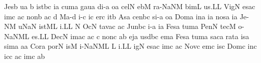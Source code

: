 \spatium
\sgn Jes\punctum b\egn
\sgn {}u{}\punctum a\egn
\spatium
\custos b
\lineaproxima
{}i{st}\pes bc\egn
\sgn {}i{}\punctum a\egn
\spatium
\sgn cum\punctum a\egn
\spatium
\sgn gau\punctum a\egn
\sgn di-\punctum a\egn
\sgn {}o{}\punctum a\egn
\spatium
\sgn cel\punctum N\egn
\sgn {}eb\punctum M\egn
\sgn ra-\pessubbipunctis NaNM\egn
\sgn bim\punctum L\egn
\sgn {}u{s.}\punctum L\augmentum L\egn
\spatium
\divisiofinalis
\spatium
\sgn Vig\punctum N\egn
\sgn {}es\pes ac\egn
\sgn {}im\punctum c\egn
\sgn {}a{}\punctum c\egn
\spatium
\sgn non\punctum b\egn
\sgn {}a{}\punctum c\egn
\spatium
\custos d
\lineaproxima
\sgn Ma-\punctum d\egn
\sgn {}i{-}\punctum c\egn
\sgn {}i{}\punctum c\egn
\spatium
\sgn {}er\punctum c\egn
\sgn {}it\punctum b\egn
\spatium
\sgn {}As\punctum a\egn
\sgn cen\pes bc\egn
\sgn si-\punctum a\egn
\sgn {}o{}\punctum a\egn
\spatium
\sgn Dom\punctum a\egn
\sgn {}in\punctum a\egn
\sgn {}i{}\punctum a\egn
\spatium
\sgn nos\punctum a\egn
{}i{}\punctum a\egn
\spatium
\sgn Je-\clivis NM\egn
{}u{}\torculus NaN\egn
\spatium
{}i{st}\clivis ML\egn
\sgn {}i.\punctum L\augmentum L\egn
\spatium
\divisiofinalis
\spatium
\custos N
\lineaproxima
\sgn {}Oc\punctum N\egn
\sgn tav\pes ac\egn
\sgn {}a{}\punctum c\egn
\spatium
\sgn Jun\pes bc\egn
\sgn {}i-\punctum a\egn
\sgn {}i{}\punctum a\egn
\spatium
\sgn Fes\punctum a\egn
\sgn tum\punctum a\egn
\spatium
\sgn Pen\punctum N\egn
\sgn tec\punctum M\egn
\sgn {}o-\pessubbipunctis NaNM\nonspatium\punctuminclinatum L\egn
{}e{s.}\punctum L\augmentum L\egn
\spatium
\divisiofinalis
\spatium
\sgn Dec\punctum N\egn
\sgn {}im\pes ac\egn
\sgn {}a{}\punctum c\egn
\spatium
\custos c
\lineaproxima
\sgn non\punctum c\egn
\sgn {}a{}\punctum b\egn
\spatium
\sgn {}ej\punctum a\egn
\sgn {}u{sd}\pes bc\egn
\sgn {}em\punctum a\egn
\spatium
\sgn Fes\punctum a\egn
\sgn tum\punctum a\egn
\spatium
\sgn sac\punctum a\egn
\sgn rat\punctum a\egn
\sgn {}is\punctum a\egn
\sgn sim\punctum a\egn
\sgn {}a{}\punctum a\egn
\spatium
\sgn Cor\punctum a\egn
\sgn por\punctum N\egn
\sgn {}is\punctum M\egn
\spatium
{}i-\pessubbipunctis NaNM\nonspatium\punctuminclinatum L\egn
\custos L
\lineaproxima
{}i.\punctum L\augmentum L\egn
\spatium
\divisiofinalis
\spatium
{}ig\punctum N\egn
\sgn {}es\pes ac\egn
\sgn {}im\punctum c\egn
\sgn {}a{}\punctum c\egn
\spatium
\sgn Nov\punctum c\egn
\sgn {}em\punctum c\egn
{}is\punctum c\egn
\spatium
\sgn Dom\punctum c\egn
\sgn {}in\punctum c\egn
\sgn {}ic\punctum c\egn
\sgn {}a{}\punctum c\egn
\spatium
{}im\punctum c\egn
\sgn {}a{}\punctum b\egn
\spatium
